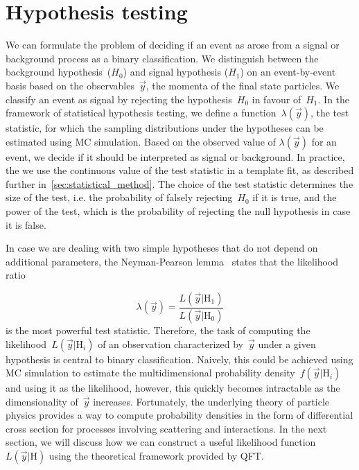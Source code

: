 \section{Hypothesis testing}
\label{sec:test_statistic}
We can formulate the problem of deciding if an event as arose from a signal or background process as a binary classification. We distinguish between the background hypothesis~($H_0$) and signal hypothesis ($H_1$) on an event-by-event basis based on the observables~$\vec{y}$, the momenta of the final state particles. We classify an event as signal by rejecting the hypothesis~$H_0$ in favour of~$H_1$. In the framework of statistical hypothesis testing, we define a function~$\lambda(\vec{y})$, the test statistic, for which the sampling distributions under the hypotheses can be estimated using MC simulation. Based on the observed value of $\lambda(\vec{y})$ for an event, we decide if it should be interpreted as signal or background. In practice, the we use the continuous value of the test statistic in a template fit, as described further in~\cref{sec:statistical_method}. The choice of the test statistic determines the size of the test, i.e. the probability of falsely rejecting~$H_0$ if it is true, and the power of the test, which is the probability of rejecting the null hypothesis in case it is false.

In case we are dealing with two simple hypotheses that do not depend on additional parameters, the Neyman-Pearson lemma~\cite{neyman1992problem} states that the likelihood ratio

\begin{equation}
\lambda(\vec{y}) = \frac{L(\vec{y}|\mathrm{H}_1)}{L(\vec{y}|\mathrm{H}_0)}
\end{equation}
is the most powerful test statistic. Therefore, the task of computing the likelihood~$L(\vec{y}|\mathrm{H}_i)$ of an observation characterized by~$\vec{y}$ under a given hypothesis is central to binary classification. Naively, this could be achieved using MC simulation to estimate the multidimensional probability density~$f(\vec{y}|\mathrm{H}_i)$ and using it as the likelihood, however, this quickly becomes intractable as the dimensionality of~$\vec{y}$ increases. Fortunately, the underlying theory of particle physics provides a way to compute probability densities in the form of differential cross section for processes involving scattering and interactions. In the next section, we will discuss how we can construct a useful likelihood function~$L(\vec{y}|\mathrm{H})$ using the theoretical framework provided by QFT.

